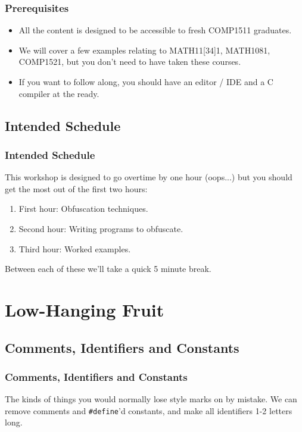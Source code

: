 \documentclass[xcolor]{beamer}
\begin{document}
\begin{frame}
	\frametitle{Prerequisites}
	\pause
	
	\begin{itemize}
		\item All the content is designed to be accessible to fresh COMP1511 graduates.
		\pause
		\item We will cover a few examples relating to MATH11[34]1, MATH1081, COMP1521, but you don't need to have taken these courses.
		\pause
		\item If you want to follow along, you should have an editor / IDE and a C compiler at the ready.
	\end{itemize}
\end{frame}

\subsection{Intended Schedule}

\begin{frame}
	\frametitle{Intended Schedule}
	\pause
	
	This workshop is designed to go overtime by one hour (oops...) but you should get the most out of the first two hours:
	\pause
	
	\begin{enumerate}
		\item First hour: Obfuscation techniques.
		\pause
		\item Second hour: Writing programs to obfuscate.
		\pause
		\item Third hour: Worked examples.
	\end{enumerate}
	\pause
	
	Between each of these we'll take a quick 5 minute break.
\end{frame}

\section{Low-Hanging Fruit}

\subsection{Comments, Identifiers and Constants}

\begin{frame}
	\frametitle{Comments, Identifiers and Constants}
	\pause
	
	The kinds of things you would normally lose style marks on by mistake. We can remove comments and \texttt{\#define}'d constants, and make all identifiers 1-2 letters long.
	\pause
	
	\begin{columns}
		\begin{column}{0.45\textwidth}
			\centering
			
		\end{column}
		\pause
		\begin{column}{0.45\textwidth}
			\centering
			
		\end{column}
	\end{columns}
\end{frame}
\end{document}
